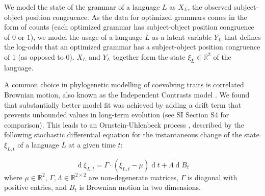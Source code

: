 \documentclass[11pt,a4paper]{article}
\begin{document}

We model the state of the grammar of a language $L$ as $X_L$, the observed subject-object position congruence.
As the data for optimized grammars comes in the form of counts (each optimized grammar has subject-object position congruence of $0$ or $1$), we model the usage of a language $L$ as a latent variable $Y_L$ that defines the log-odds that an optimized grammar has a subject-object position congruence of 1 (as opposed to 0).
$X_L$ and $Y_L$ together form the state $\xi_L \in \mathbb{R}^2$  of the language.



A common choice in phylogenetic modelling of coevolving traits is correlated Brownian motion, also known as the Independent Contrasts model \citep{felsenstein1973maximum,freckleton2012fast}.
We found that substantially better model fit was achieved by adding a drift term that prevents unbounded values  in long-term evolution (see SI Section S4 for comparison).
This leads to an Ornstein-Uhlenbeck process \citep{felsenstein1988phylogenies,hansen1997stabilizing,blackwell2003bayesian}, described by the following stochastic differential equation for the instantaneous change of the state $\xi_{L,t}$ of a language $L$ at a given time $t$:

\begin{equation*}
    \operatorname{d}\xi_{L,t} = \Gamma \cdot (\xi_{L,t}-\mu) \operatorname{d}t + \Lambda \operatorname{d}B_t
\end{equation*}
where $\mu \in \mathbb{R}^2$,  $\Gamma, \Lambda \in \mathbb{R}^{2\times 2}$ are non-degenerate matrices, $\Gamma$ is diagonal with positive entries, and $B_t$ is Brownian motion in two dimensions.
\end{document}
